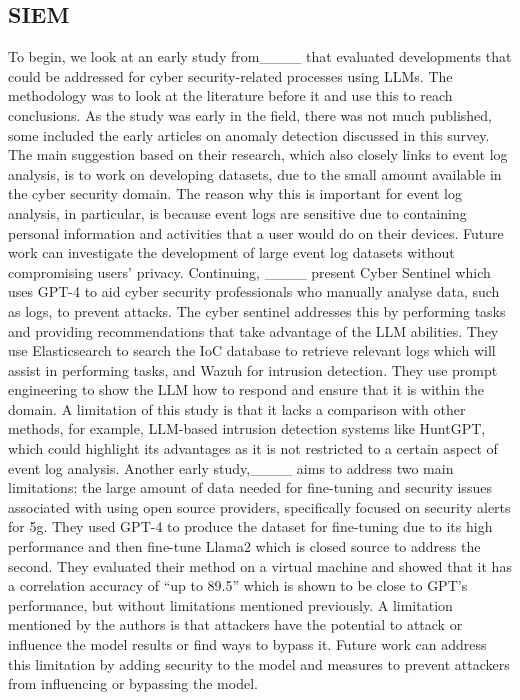 \subsection{SIEM}
To begin, we look at an early study from____ that evaluated developments that could be addressed for cyber security-related processes using LLMs. The methodology was to look at the literature before it and use this to reach conclusions. As the study was early in the field, there was not much published, some included the early articles on anomaly detection discussed in this survey. The main suggestion based on their research, which also closely links to event log analysis, is to work on developing datasets, due to the small amount available in the cyber security domain. The reason why this is important for event log analysis, in particular, is because event logs are sensitive due to containing personal information and activities that a user would do on their devices. Future work can investigate the development of large event log datasets without compromising users' privacy. Continuing, ____ present Cyber Sentinel which uses GPT-4 to aid cyber security professionals who manually analyse data, such as logs, to prevent attacks. The cyber sentinel addresses this by performing tasks and providing recommendations that take advantage of the LLM abilities. They use Elasticsearch to search the IoC database to retrieve relevant logs which will assist in performing tasks, and Wazuh for intrusion detection. They use prompt engineering to show the LLM how to respond and ensure that it is within the domain. A limitation of this study is that it lacks a comparison with other methods, for example, LLM-based intrusion detection systems like HuntGPT, which could highlight its advantages as it is not restricted to a certain aspect of event log analysis. Another early study,____ aims to address two main limitations: the large amount of data needed for fine-tuning and security issues associated with using open source providers, specifically focused on security alerts for 5g. They used GPT-4 to produce the dataset for fine-tuning due to its high performance and then fine-tune Llama2 which is closed source to address the second. They evaluated their method on a virtual machine and showed that it has a correlation accuracy of ``up to 89.5'' which is shown to be close to GPT's performance, but without limitations mentioned previously. A limitation mentioned by the authors is that attackers have the potential to attack or influence the model results or find ways to bypass it. Future work can address this limitation by adding security to the model and measures to prevent attackers from influencing or bypassing the model.

